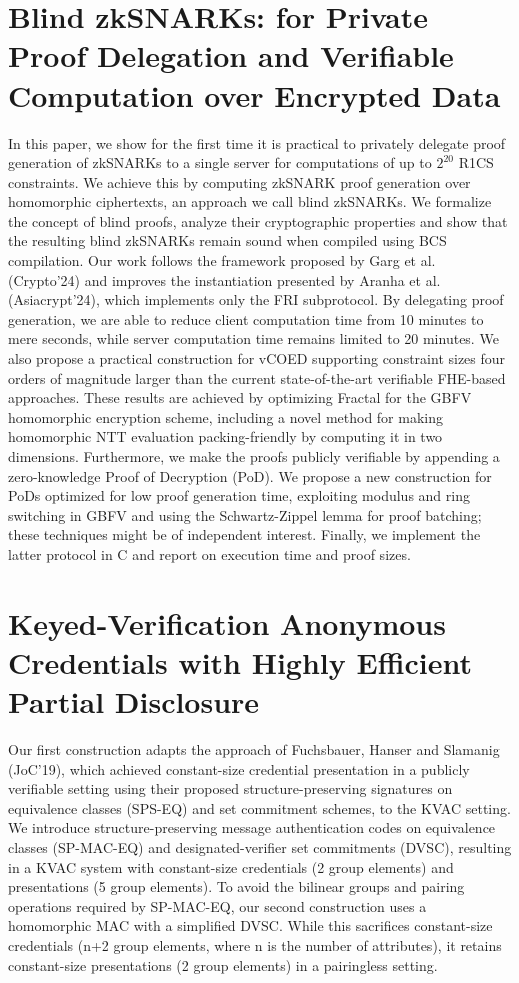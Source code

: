 \documentclass[11pt,oneside]{book}
\theoremstyle{definition}
\theoremstyle{remark}
\theoremstyle{plain}
\begin{document}
\section{\cite{10.62056/akgyl8n4e} Blind zkSNARKs: for Private Proof Delegation and Verifiable Computation over Encrypted Data}
In this paper, we show for the first time it is practical to privately delegate proof generation of zkSNARKs to a single server for computations of up to $2^{20}$ R1CS constraints. We achieve this by computing zkSNARK proof generation over homomorphic ciphertexts, an approach we call blind zkSNARKs. We formalize the concept of blind proofs, analyze their cryptographic properties and show that the resulting blind zkSNARKs remain sound when compiled using BCS compilation. Our work follows the framework proposed by Garg et al. (Crypto'24) and improves the instantiation presented by Aranha et al. (Asiacrypt'24), which implements only the FRI subprotocol. By delegating proof generation, we are able to reduce client computation time from 10 minutes to mere seconds, while server computation time remains limited to 20 minutes. We also propose a practical construction for vCOED supporting constraint sizes four orders of magnitude larger than the current state-of-the-art verifiable FHE-based approaches. These results are achieved by optimizing Fractal for the GBFV homomorphic encryption scheme, including a novel method for making homomorphic NTT evaluation packing-friendly by computing it in two dimensions. Furthermore, we make the proofs publicly verifiable by appending a zero-knowledge Proof of Decryption (PoD). We propose a new construction for PoDs optimized for low proof generation time, exploiting modulus and ring switching in GBFV and using the Schwartz-Zippel lemma for proof batching; these techniques might be of independent interest. Finally, we implement the latter protocol in C and report on execution time and proof sizes.

\section{\cite{10.62056/aey7n59p1} Keyed-Verification Anonymous Credentials with Highly Efficient Partial Disclosure}
Our first construction adapts the approach of Fuchsbauer, Hanser and Slamanig (JoC'19), which achieved constant-size credential presentation in a publicly verifiable setting using their proposed structure-preserving signatures on equivalence classes (SPS-EQ) and set commitment schemes, to the KVAC setting. We introduce structure-preserving message authentication codes on equivalence classes (SP-MAC-EQ) and designated-verifier set commitments (DVSC), resulting in a KVAC system with constant-size credentials (2 group elements) and presentations (5 group elements). To avoid the bilinear groups and pairing operations required by SP-MAC-EQ, our second construction uses a homomorphic MAC with a simplified DVSC. While this sacrifices constant-size credentials (n+2 group elements, where n is the number of attributes), it retains constant-size presentations (2 group elements) in a pairingless setting.
\end{document}
